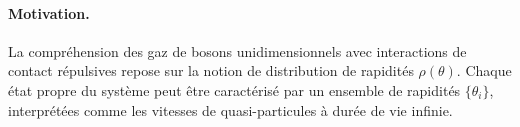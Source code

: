 
\paragraph{Motivation.}  
La compréhension des gaz de bosons unidimensionnels avec interactions de contact répulsives repose sur la notion de distribution de rapidités \(\rho(\theta)\). Chaque état propre du système peut être caractérisé par un ensemble de rapidités \(\{\theta_i\}\), interprétées comme les vitesses de quasi-particules à durée de vie infinie.  

